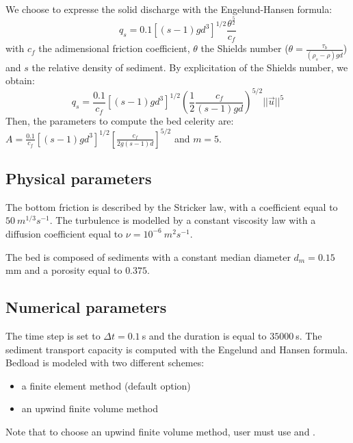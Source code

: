 We choose to expresse the solid discharge with the Engelund-Hansen formula:
  \begin{equation*}
  q_s=0.1 \left[\left(s-1\right)gd^3\right]^{1/2}\frac{\theta^{\frac{5}{2}}}{c_f}
  \end{equation*}
 with $c_f$ the adimensional friction coefficient, $\theta$ the Shields number ($\theta=\frac{\tau_b}{(\rho_s-\rho)gd}$) and $s$ the relative density of sediment.
By explicitation of the Shields number, we obtain:
 \begin{equation*}
  q_s=\frac{0.1}{c_f} \left[\left(s-1\right)gd^3\right]^{1/2}\left(\frac{1}{2}\frac{ c_f}{(s-1)gd} \right)^{5/2}||\vec{u}||^5
 \end{equation*}
Then, the parameters to compute the bed celerity are: \\
$A=\frac{0.1}{c_f}\left[\left( s-1\right)gd^3 \right]^{1/2}\left[\frac{c_f}{2g\left( s-1\right)d} \right]^{5/2}$ and $m=5$.


\subsection{Physical parameters}
%

The bottom friction is described by the Stricker law, with a coefficient equal to $50~m^{1/3}s^{-1}$. The turbulence is modelled by a constant viscosity law with a diffusion coefficient equal to $\nu=10^{-6}~m^2s^{-1}$.

The bed is composed of sediments with a constant median diameter $d_m=0.15~$ mm and a porosity equal to $0.375$.


%
%
\subsection{Numerical parameters}

The time step is set to $\Delta t=0.1~$s and the duration is equal to $35000~$s.
The sediment transport capacity is computed with the Engelund and Hansen formula. Bedload is modeled with two different schemes:
\begin{itemize}
\item a finite element method (default option)
\item an upwind finite volume method
\end{itemize}
Note that to choose an upwind finite volume method, user must use  and .
%
%
